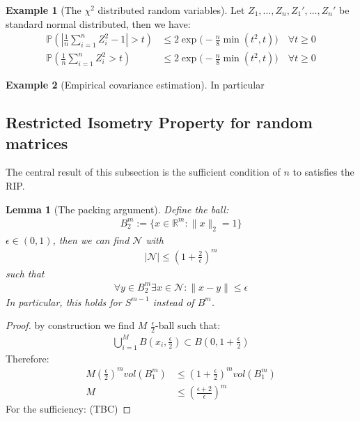 \documentclass[a4paper,12pt, oneside, fleqn]{book}
\newtheorem{lemma}[theorem]{Lemma}
\theoremstyle{definition}
\newtheorem*{example}{Example}
\theoremstyle{remark}
\begin{document}
\begin{example}[The $\chi^2$ distributed random variables]
	Let $Z_1, \dots, Z_n, Z_1', \dots, Z_n'$ be standard normal distributed, then we have:
	\begin{align*}
		\mathbb{P}(|\frac{1}{n}\sum_{i = 1}^n Z_i^2 - 1|> t ) &\le 2\exp \bigg(-\frac{n}{8}\min(t^2, t) \bigg) \quad \forall t \ge 0\\
		\mathbb{P}(\frac{1}{n}\sum_{i = 1}^n Z_i^2 > t) &\le 2\exp\bigg(-\frac{n}{8}\min(t^2,t)\bigg) \quad \forall t \ge 0
	\end{align*}
\end{example}

\begin{example}[Empirical covariance estimation]
	In particular
\end{example}



\subsection{Restricted Isometry Property for random matrices}
The central result of this subsection is the sufficient condition of $n$ to satisfies the RIP.
\begin{lemma}[The packing argument]
	Define the ball:
	\begin{align*}
		B_2^m:= \{ x \in \mathbb{R}^m: \|x\|_2 = 1\}
	\end{align*}
	$\epsilon \in (0, 1)$, then we can find $\mathcal{N}$ with 
	\begin{align*}
		|\mathcal{N}| \leq (1 + \frac{2}{\epsilon})^m
	\end{align*}
	such that
	\begin{align*}
		\forall y \in B_2^m \exists x \in \mathcal{N}: \|x - y\| \leq \epsilon
	\end{align*}
	In particular, this holds for $S^{m-1}$ instead of $B^m$.
\end{lemma}
\begin{proof}
	by construction we find $M$ $\frac{\epsilon}{2}$-ball such that:
	\begin{align*}
		\bigcup_{i = 1}^M B(x_i, \frac{\epsilon}{2}) \subset B(0, 1 + \frac{\epsilon}{2})
	\end{align*}
	Therefore:
	\begin{align*}
		M (\frac{\epsilon}{2})^m vol(B_1^m) &\le (1 + \frac{\epsilon}{2})^m vol(B_1^m)\\
		M &\le (\frac{\epsilon + 2}{\epsilon} )^m
	\end{align*}
	For the sufficiency: (TBC)
\end{proof}
\end{document}
